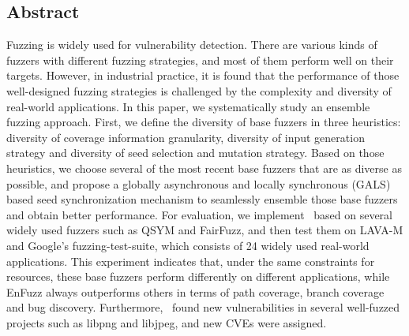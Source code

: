 \subsection*{Abstract}
Fuzzing is widely used for vulnerability detection.
There are various kinds of fuzzers with different fuzzing strategies, and most of them perform well on their targets. 
However, in industrial practice, it is found that the performance of those well-designed fuzzing strategies is challenged by the complexity and diversity of real-world applications. 
%
In this paper, 
we systematically study an ensemble fuzzing approach.
First, we define the diversity of base fuzzers in three heuristics: diversity of coverage information granularity, diversity of input generation strategy and diversity of seed selection and mutation strategy. Based on those heuristics, we choose several of the most recent base fuzzers that are as diverse as possible, and propose a globally asynchronous and locally synchronous (GALS) based seed synchronization mechanism to seamlessly ensemble those base fuzzers and obtain better performance. 
%
For evaluation, we implement \EnFuzz ~based on several widely used fuzzers such as QSYM and FairFuzz, and then test them on LAVA-M and Google's fuzzing-test-suite, which consists of 24 widely used real-world applications. This experiment indicates that, under the same constraints for resources, these base fuzzers perform differently on different applications, while EnFuzz always outperforms others in terms of path coverage, branch coverage and bug discovery. Furthermore, \EnFuzz ~found \bugnum new vulnerabilities in several well-fuzzed projects such as libpng and libjpeg, and \cvenum new CVEs were assigned.




